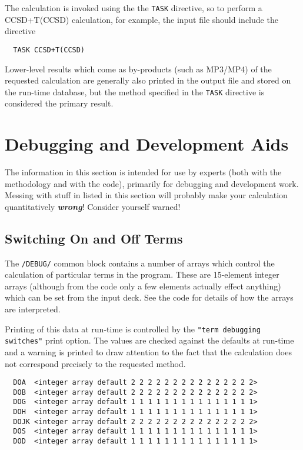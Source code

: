 The calculation is invoked using the the \verb+TASK+ directive, so to
perform a CCSD+T(CCSD) calculation, for example, the input file should
include the directive
\begin{verbatim}
  TASK CCSD+T(CCSD)
\end{verbatim}

Lower-level results which come as by-products (such as MP3/MP4) of the
requested calculation are generally also printed in the output file
and stored on the run-time database, but the method specified in the
\verb+TASK+ directive is considered the primary result.

\section{Debugging and Development Aids}

The information in this section is intended for use by experts (both
with the methodology and with the code), primarily for debugging and
development work.  Messing with stuff in listed in this section will
probably make your calculation quantitatively {\em\bf wrong}\/!
Consider yourself warned!

\subsection{Switching On and Off Terms}

The \verb+/DEBUG/+ common block contains a number of arrays which
control the calculation of particular terms in the program.  These are
15-element integer arrays (although from the code only a few elements
actually effect anything) which can be set from the input deck.  See
the code for details of how the arrays are interpreted.  

Printing of this data at run-time is controlled by the
\verb+"term debugging switches"+ print option.  The values are checked against
the defaults at run-time and a warning is printed to draw attention to
the fact that the calculation does not correspond precisely to the
requested method.

\begin{verbatim}
  DOA  <integer array default 2 2 2 2 2 2 2 2 2 2 2 2 2 2 2>
  DOB  <integer array default 2 2 2 2 2 2 2 2 2 2 2 2 2 2 2>
  DOG  <integer array default 1 1 1 1 1 1 1 1 1 1 1 1 1 1 1>
  DOH  <integer array default 1 1 1 1 1 1 1 1 1 1 1 1 1 1 1>
  DOJK <integer array default 2 2 2 2 2 2 2 2 2 2 2 2 2 2 2>
  DOS  <integer array default 1 1 1 1 1 1 1 1 1 1 1 1 1 1 1>
  DOD  <integer array default 1 1 1 1 1 1 1 1 1 1 1 1 1 1 1>
\end{verbatim}
